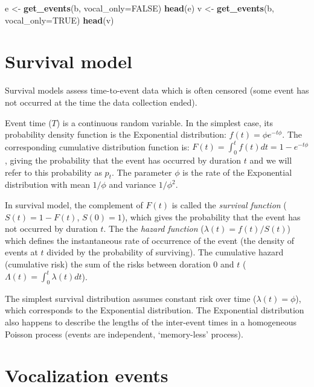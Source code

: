 \documentclass[12pt,]{book}
\newenvironment{Shaded}{\begin{snugshade}}{\end{snugshade}}
\newcommand{\DataTypeTok}[1]{\textcolor[rgb]{0.13,0.29,0.53}{#1}}
\newcommand{\KeywordTok}[1]{\textcolor[rgb]{0.13,0.29,0.53}{\textbf{#1}}}
\newcommand{\NormalTok}[1]{#1}
\newcommand{\OtherTok}[1]{\textcolor[rgb]{0.56,0.35,0.01}{#1}}
\newcommand{\StringTok}[1]{\textcolor[rgb]{0.31,0.60,0.02}{#1}}
\begin{document}
\begin{Shaded}
\begin{Highlighting}[]
\NormalTok{e <-}\StringTok{ }\KeywordTok{get_events}\NormalTok{(b, }\DataTypeTok{vocal_only=}\OtherTok{FALSE}\NormalTok{)}
\KeywordTok{head}\NormalTok{(e)}
\NormalTok{v <-}\StringTok{ }\KeywordTok{get_events}\NormalTok{(b, }\DataTypeTok{vocal_only=}\OtherTok{TRUE}\NormalTok{)}
\KeywordTok{head}\NormalTok{(v)}
\end{Highlighting}
\end{Shaded}

\hypertarget{survival-model}{%
\section{Survival model}\label{survival-model}}

Survival models assess time-to-event data which is often censored
(some event has not occurred at the time the data collection ended).

Event time (\(T\)) is a continuous random variable.
In the simplest case, its probability density function is the Exponential
distribution: \(f(t)=\phi e^{-t\phi}\).
The corresponding cumulative distribution function is:
\(F(t)=\int_{0}^{t} f(t)dt=1-e^{-t\phi}\),
giving the probability that the event has occurred by duration \(t\) and we will refer to
this probability as \(p_t\). The parameter \(\phi\) is the rate of the Exponential distribution
with mean \(1/\phi\) and variance \(1/\phi^2\).

In survival model, the complement of \(F(t)\) is called the
\emph{survival function} (\(S(t)=1-F(t)\), \(S(0)=1\)),
which gives the probability that the event has not occurred by duration \(t\).
The the \emph{hazard function} (\(\lambda(t)=f(t)/S(t)\))
which defines the instantaneous rate of occurrence of the event
(the density of events at \(t\) divided by the probability of surviving).
The cumulative hazard (cumulative risk) the sum of the risks between doration 0 and \(t\)
(\(\Lambda(t)=\int_{0}^{t} \lambda(t)dt\)).

The simplest survival distribution assumes constant risk over time (\(\lambda(t)=\phi\)),
which corresponds to the Exponential distribution.
The Exponential distribution also happens to describe the lengths of the
inter-event times in a homogeneous Poisson process (events are independent, `memory-less' process).

\hypertarget{vocalization-events}{%
\section{Vocalization events}\label{vocalization-events}}
\end{document}
